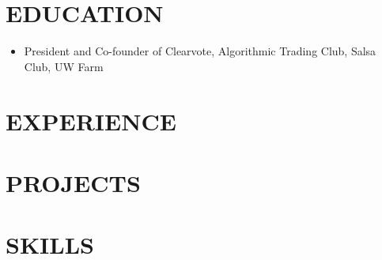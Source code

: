 \documentclass[10.5pt,letterpaper]{article}
\begin{document}
\vspace{-10pt}

\section{\faGraduationCap{ }EDUCATION}
\vspace{4pt}
\educationentry
\begin{itemize}[leftmargin=2em, nosep, noitemsep]
    \item[] President and Co-founder of Clearvote, Algorithmic Trading Club, Salsa Club, UW Farm
\end{itemize}
\vspace{-10pt}

\section{\faCode{ }EXPERIENCE}
\vspace{4pt}




\vspace{-10pt}

\section{\faFolderOpen{ }PROJECTS}
\vspace{3pt}



\vspace{-20pt}

\section{\faDatabase{ }SKILLS}
\vspace{4pt}


\end{document}
